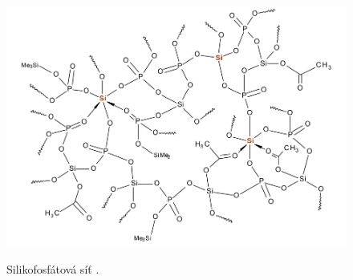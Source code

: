 \documentclass[
  printed, %
  table,   %
  lof,     %
  lot,     %
  oneside,
]{fithesis3}
\begin{document}
\begin{otherlanguage}{czech}

\begin{figure}[h!]
\caption{Silikofosfátová síť \cite{Styskalik2015thesis}. }
  \center
  \includegraphics[width=12cm]{si_polymer_cely.png}
  \label{si_polymer_cely}
  \end{figure}

\begin{figure}
\begin{center}


\end{center}
\end{figure}
\end{otherlanguage}
\end{document}
